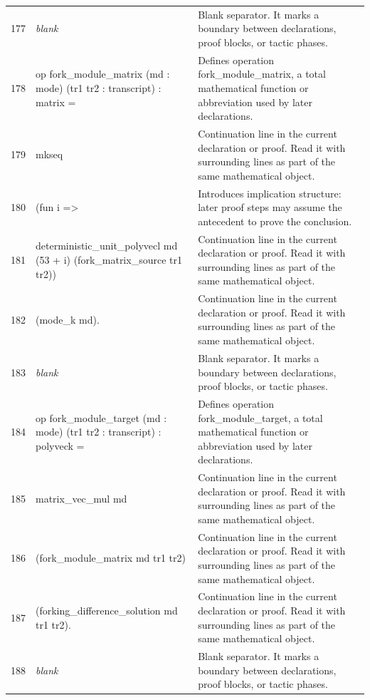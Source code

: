 \documentclass[10pt]{article}
\begin{document}
\begin{longtable}{r L{0.53\textwidth} L{0.37\textwidth}}
177 & {\ttfamily\scriptsize \emph{blank}} & Blank separator.  It marks a boundary between declarations, proof blocks, or tactic phases. \\
178 & {\ttfamily\scriptsize op fork\_module\_matrix (md : mode) (tr1 tr2 : transcript) : matrix =} & Defines operation fork\_module\_matrix, a total mathematical function or abbreviation used by later declarations. \\
179 & {\ttfamily\scriptsize   mkseq} & Continuation line in the current declaration or proof.  Read it with surrounding lines as part of the same mathematical object. \\
180 & {\ttfamily\scriptsize     (fun i =>} & Introduces implication structure: later proof steps may assume the antecedent to prove the conclusion. \\
181 & {\ttfamily\scriptsize       deterministic\_unit\_polyvecl md (53 + i) (fork\_matrix\_source tr1 tr2))} & Continuation line in the current declaration or proof.  Read it with surrounding lines as part of the same mathematical object. \\
182 & {\ttfamily\scriptsize     (mode\_k md).} & Continuation line in the current declaration or proof.  Read it with surrounding lines as part of the same mathematical object. \\
183 & {\ttfamily\scriptsize \emph{blank}} & Blank separator.  It marks a boundary between declarations, proof blocks, or tactic phases. \\
184 & {\ttfamily\scriptsize op fork\_module\_target (md : mode) (tr1 tr2 : transcript) : polyveck =} & Defines operation fork\_module\_target, a total mathematical function or abbreviation used by later declarations. \\
185 & {\ttfamily\scriptsize   matrix\_vec\_mul md} & Continuation line in the current declaration or proof.  Read it with surrounding lines as part of the same mathematical object. \\
186 & {\ttfamily\scriptsize     (fork\_module\_matrix md tr1 tr2)} & Continuation line in the current declaration or proof.  Read it with surrounding lines as part of the same mathematical object. \\
187 & {\ttfamily\scriptsize     (forking\_difference\_solution md tr1 tr2).} & Continuation line in the current declaration or proof.  Read it with surrounding lines as part of the same mathematical object. \\
188 & {\ttfamily\scriptsize \emph{blank}} & Blank separator.  It marks a boundary between declarations, proof blocks, or tactic phases. \\

\end{longtable}
\end{document}
